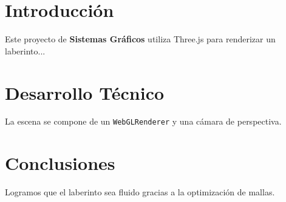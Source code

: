 \documentclass[12pt,a4paper]{article}
\begin{document}

\tableofcontents
\newpage

\section{Introducción}
Este proyecto de \textbf{Sistemas Gráficos} utiliza Three.js para renderizar un laberinto...

\section{Desarrollo Técnico}
La escena se compone de un \texttt{WebGLRenderer} y una cámara de perspectiva.

\section{Conclusiones}
Logramos que el laberinto sea fluido gracias a la optimización de mallas.
\end{document}
